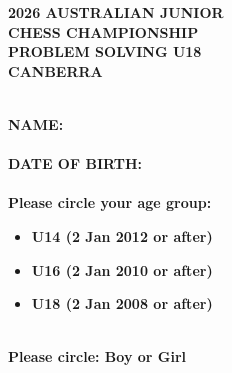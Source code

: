\documentclass[14pt]{article}
\begin{document}
\begin{titlepage}
\thispagestyle{fancy}


\begin{center}
\vspace{20mm}
\textbf{\Huge 2026 AUSTRALIAN JUNIOR}\\
\vspace{6mm}
\textbf{\Huge CHESS CHAMPIONSHIP}\\
\vspace{6mm}
\textbf{\Huge PROBLEM SOLVING U18}\\
\vspace{6mm}
\textbf{\Huge CANBERRA}\\
\end{center}

\vspace{8mm}\\
\textbf{\LARGE NAME: \hspace{3mm} \underline{\hspace{8cm}}}\\
\vspace{5mm}\\
\textbf{\LARGE DATE OF BIRTH: \hspace{3mm} \underline{\hspace{5cm}}}\\
\vspace{5mm}\\

\textbf{\LARGE Please circle your age group:}\\
\begin{itemize}
  \item \textbf{\Large  U14 (2 Jan 2012 or after)}
  \item \textbf{\Large  U16 (2 Jan 2010 or after)}
  \item \textbf{\Large  U18 (2 Jan 2008 or after)}
\end{itemize}
\vspace{5mm}\\

\textbf{\LARGE Please circle: Boy or Girl}\\
\vspace{5mm}\\


\end{titlepage}
\end{document}
